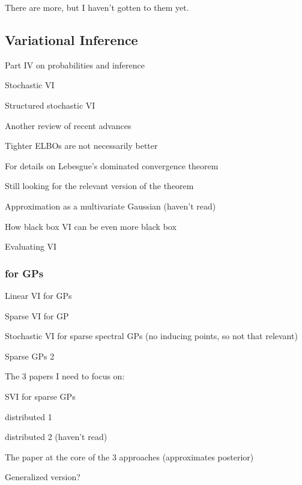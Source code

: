 \documentclass{mprop}
\theoremstyle{definition}
\begin{document}
There are more, but I haven't gotten to them yet.

\subsection{Variational Inference}

Part IV on probabilities and inference \cite{MacKay:2002:ITI:971143}

Stochastic VI \cite{DBLP:journals/jmlr/HoffmanBWP13}

Structured stochastic VI \cite{DBLP:conf/aistats/HoffmanB15}

Another review of recent advances \cite{DBLP:journals/corr/abs-1711-05597}

Tighter ELBOs are not necessarily better \cite{DBLP:conf/icml/RainforthKLMIWT18}

For details on Lebesgue's dominated convergence theorem \cite{cinlar_probability}

Still looking for the relevant version of the theorem \cite{knill2017probability}

Approximation as a multivariate Gaussian (haven't read) \cite{DBLP:journals/sac/TanN18}

How black box VI can be even more black box \cite{li2016wild}

Evaluating VI \cite{DBLP:conf/icml/YaoVSG18}

\subsubsection{for GPs}

Linear VI for GPs \cite{DBLP:conf/nips/ChengB17}

Sparse VI for GP \cite{DBLP:journals/jmlr/HensmanDS17}

Stochastic VI for sparse spectral GPs (no inducing points, so not that relevant) \cite{DBLP:conf/aaai/HoangHL17}

Sparse GPs 2 \cite{DBLP:conf/nips/GalWR14}

The 3 papers I need to focus on:

SVI for sparse GPs \cite{DBLP:conf/uai/HensmanFL13}

distributed 1 \cite{DBLP:conf/icml/HoangHL15}

distributed 2 (haven't read) \cite{DBLP:conf/icml/PengZZQ17}

The paper at the core of the 3 approaches (approximates posterior) \cite{DBLP:journals/jmlr/Titsias09}

Generalized version? \cite{DBLP:conf/icml/ShethWK15}



\end{document}
